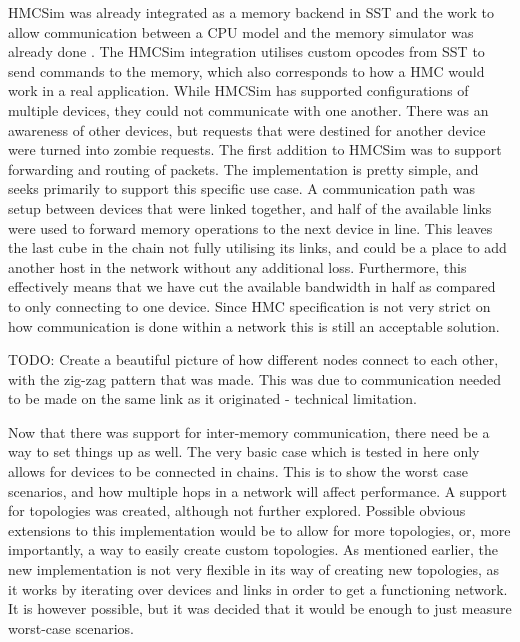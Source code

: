 HMCSim was already integrated as a memory backend in SST and the work to allow communication between a CPU model and the memory simulator was already done \cite{voskuilen2018sst}. The HMCSim integration utilises custom opcodes from SST to send commands to the memory, which also corresponds to how a HMC would work in a real application. While HMCSim has supported configurations of multiple devices, they could not communicate with one another. There was an awareness of other devices, but requests that were destined for another device were turned into zombie requests. The first addition to HMCSim was to support forwarding and routing of packets. The implementation is pretty simple, and seeks primarily to support this specific use case. A communication path was setup between devices that were linked together, and half of the available links were used to forward memory operations to the next device in line. This leaves the last cube in the chain not fully utilising its links, and could be a place to add another host in the network without any additional loss. Furthermore, this effectively means that we have cut the available bandwidth in half as compared to only connecting to one device. Since HMC specification is not very strict on how communication is done within a network this is still an acceptable solution.
\bigskip

TODO: Create a beautiful picture of how different nodes connect to each other, with the zig-zag pattern that was made. This was due to communication needed to be made on the same link as it originated - technical limitation.
\bigskip

Now that there was support for inter-memory communication, there need be a way to set things up as well. The very basic case which is tested in here only allows for devices to be connected in chains. This is to show the worst case scenarios, and how multiple hops in a network will affect performance. A support for topologies was created, although not further explored. Possible obvious extensions to this implementation would be to allow for more topologies, or, more importantly, a way to easily create custom topologies. As mentioned earlier, the new implementation is not very flexible in its way of creating new topologies, as it works by iterating over devices and links in order to get a functioning network. It is however possible, but it was decided that it would be enough to just measure worst-case scenarios.
\bigskip


